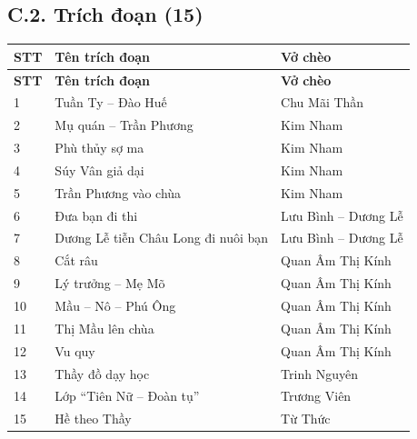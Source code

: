\subsection*{C.2. Trích đoạn (15)}

\begin{longtable}{|p{0.8cm}|p{7.4cm}|p{5.6cm}|}
  \hline
  \textbf{STT} & \textbf{Tên trích đoạn} & \textbf{Vở chèo} \\
  \hline
  \endfirsthead
  \hline
  \textbf{STT} & \textbf{Tên trích đoạn} & \textbf{Vở chèo} \\
  \hline
  \endhead
  \hline
  \endfoot

  1  & Tuần Ty -- Đào Huế                              & Chu Mãi Thần          \\ \hline
  2  & Mụ quán -- Trần Phương                          & Kim Nham              \\ \hline
  3  & Phù thủy sợ ma                                  & Kim Nham              \\ \hline
  4  & Súy Vân giả dại                                 & Kim Nham              \\ \hline
  5  & Trần Phương vào chùa                            & Kim Nham              \\ \hline
  6  & Đưa bạn đi thi                                  & Lưu Bình -- Dương Lễ  \\ \hline
  7  & Dương Lễ tiễn Châu Long đi nuôi bạn             & Lưu Bình -- Dương Lễ  \\ \hline
  8  & Cắt râu                                         & Quan Âm Thị Kính      \\ \hline
  9  & Lý trưởng -- Mẹ Mõ                              & Quan Âm Thị Kính      \\ \hline
  10 & Mầu -- Nô -- Phú Ông                            & Quan Âm Thị Kính      \\ \hline
  11 & Thị Mầu lên chùa                                & Quan Âm Thị Kính      \\ \hline
  12 & Vu quy                                          & Quan Âm Thị Kính      \\ \hline
  13 & Thầy đồ dạy học                                 & Trinh Nguyên          \\ \hline
  14 & Lớp ``Tiên Nữ -- Đoàn tụ''                      & Trương Viên           \\ \hline
  15 & Hề theo Thầy                                    & Từ Thức               \\ \hline
\end{longtable}

